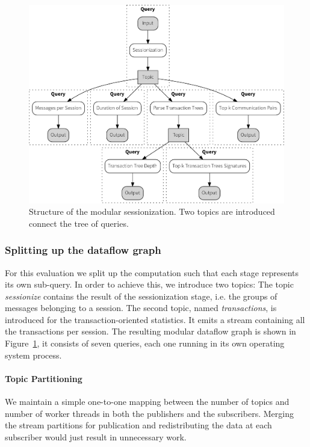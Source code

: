 \begin{figure}[p]
  \centering
    \includegraphics[width=1\textwidth]{figures/sessionize_split-crop}
  \caption[Dataflow graph for modular sessionization]{Structure of the modular
  sessionization. Two topics are introduced connect the tree of queries.}
  \label{fig:split}
\end{figure}

\subsubsection{Splitting up the dataflow graph}

For this evaluation we split up the computation such that each stage represents
its own sub-query. In order to achieve this, we introduce two topics: The topic
\emph{sessionize} contains the result of the sessionization stage, i.e. 
the groups of messages belonging to a session. The second topic, named
\emph{transactions}, is introduced for the transaction-oriented statistics.
It emits a stream containing all the transactions per session. The resulting
modular dataflow graph is shown in Figure~\ref{fig:split}, it consists of
seven queries, each one running in its own operating system process.


\paragraph{Topic Partitioning}

We maintain a simple one-to-one mapping between the number of topics and
number of worker threads in both the publishers and the subscribers.
Merging the stream partitions for publication and redistributing
the data at each subscriber would just result in unnecessary work.

